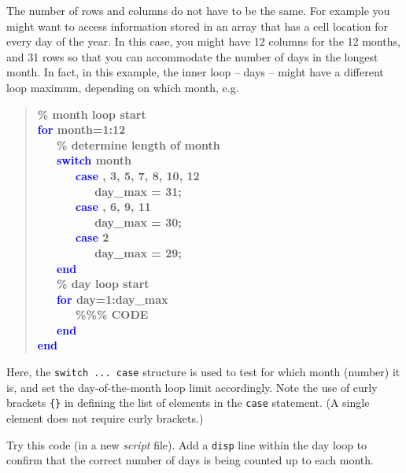 \documentclass{tufte-book} %
\newenvironment{docspecbold}{\begin{quotation}\ttfamily\bfseries\parskip0pt\parindent0pt\ignorespaces}{\end{quotation}}
\begin{document}
The number of rows and columns do not have to be the same. For example you might want to access information stored in an array that has a cell location for every day of the year. In this case, you might have 12 columns for the 12 months, and 31 rows so that you can accommodate the number of days in the longest month. In fact, in this example, the inner loop -- days -- might have a different loop maximum, depending on which month, e.g.
\begin{docspecbold}
\textcolor[rgb]{0,0.501961,0}{\% month loop start\\}
\textcolor{blue}{for} month=1:12\\
\ \ \ \textcolor[rgb]{0,0.501961,0}{\% determine length of month\\}
\ \ \ \textcolor{blue}{switch} month\\
\ \ \ \ \ \     \textcolor{blue}{case} {, 3, 5, 7, 8, 10, 12\textbraceright}\\
\ \ \ \ \ \ \ \ \         day\_max = 31;\\
\ \ \ \ \ \     \textcolor{blue}{case} {, 6, 9, 11\textbraceright}\\
\ \ \ \ \ \ \ \ \         day\_max = 30;\\
\ \ \ \ \ \     \textcolor{blue}{case} {2}\\
\ \ \ \ \ \ \ \ \         day\_max = 29;\\
\ \ \ \textcolor{blue}{end}\\
\ \ \ \textcolor[rgb]{0,0.501961,0}{\% day loop start\\}
\ \ \ \textcolor{blue}{for} day=1:day\_max\\
\ \ \ \ \ \ \textcolor[rgb]{0,0.501961,0}{\%\%\% CODE\\}
\ \ \ \textcolor{blue}{end}\\
\textcolor{blue}{end}
\end{docspecbold}
Here, the \texttt{switch ... case} structure is used to test for which month (number) it is, and set the day-of-the-month loop limit accordingly.
Note the use of curly brackets \texttt{\{\}} in defining the list of elements in the \texttt{case} statement. (A single element does not require curly brackets.)

Try this code (in a new \textit{script} file). Add a \texttt{disp} line within the day loop to confirm that the correct number of days is being counted up to each month.
\end{document}
